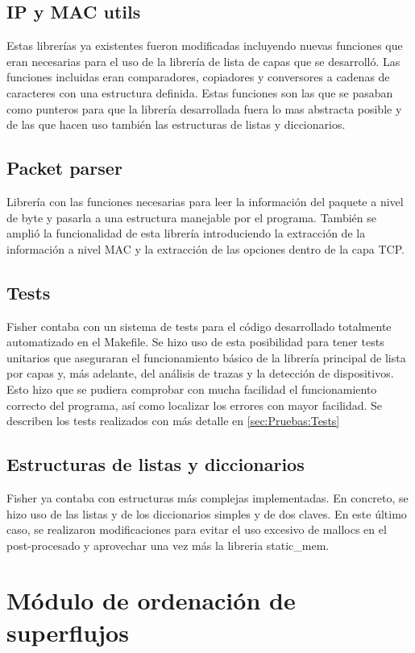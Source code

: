 \documentclass[twoside, 12pt]{epstfg}
\begin{document}
\subsection{IP y MAC utils}
Estas librerías ya existentes fueron modificadas incluyendo nuevas funciones que eran necesarias para el uso de la librería de lista de capas que se desarrolló. Las funciones incluidas eran comparadores, copiadores y conversores a cadenas de caracteres con una estructura definida. Estas funciones son las que se pasaban como punteros para que la librería desarrollada fuera lo mas abstracta posible y de las que hacen uso también las estructuras de listas y diccionarios.
\subsection{Packet parser}
Librería con las funciones necesarias para leer la información del paquete a nivel de byte y pasarla a una estructura manejable por el programa. También se amplió la funcionalidad de esta librería introduciendo la extracción de la información a nivel MAC y la extracción de las opciones dentro de la capa TCP.
\subsection{Tests}
Fisher contaba con un sistema de tests para el código desarrollado totalmente automatizado en el Makefile. Se hizo uso de esta posibilidad para tener tests unitarios que aseguraran el funcionamiento básico de la librería principal de lista por capas y, más adelante, del análisis de trazas y la detección de dispositivos. Esto hizo que se pudiera comprobar con mucha facilidad el funcionamiento correcto del programa, así como localizar los errores con mayor facilidad. Se describen los tests realizados con más detalle en \ref{sec:Pruebas:Tests}

\subsection{Estructuras de listas y diccionarios}
Fisher ya contaba con estructuras más complejas implementadas. En concreto, se hizo uso de las listas y de los diccionarios simples y de dos claves. En este último caso, se realizaron modificaciones para evitar el uso excesivo de mallocs en el post-procesado y aprovechar una vez más la libreria static\_mem.

\section{Módulo de ordenación de superflujos}
\end{document}
